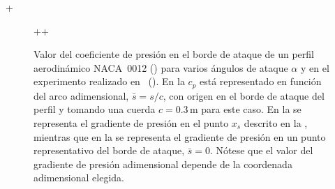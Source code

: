 +\begin{figure}
\centering
{}
++
\caption{Valor del coeficiente de presión en el borde de ataque de un perfil aerodinámico NACA~0012 () para varios ángulos de ataque $\alpha$  y en el experimento realizado en~\cite{Evangelio2015b} (). En la  $c_{p}$ está representado en función del arco adimensional, $\bar{s} = s/c$, con origen en el borde de ataque del perfil y tomando una cuerda $c = 0.3\,\mathrm{m}$ para este caso. En la  se representa el gradiente de presión en el punto $x_{s}$ descrito en la , mientras que en la se representa el gradiente de presión en un punto representativo del borde de ataque, $\bar{s}=0$. Nótese que el valor del gradiente de presión adimensional depende de la coordenada adimensional elegida.} 
\end{figure}



